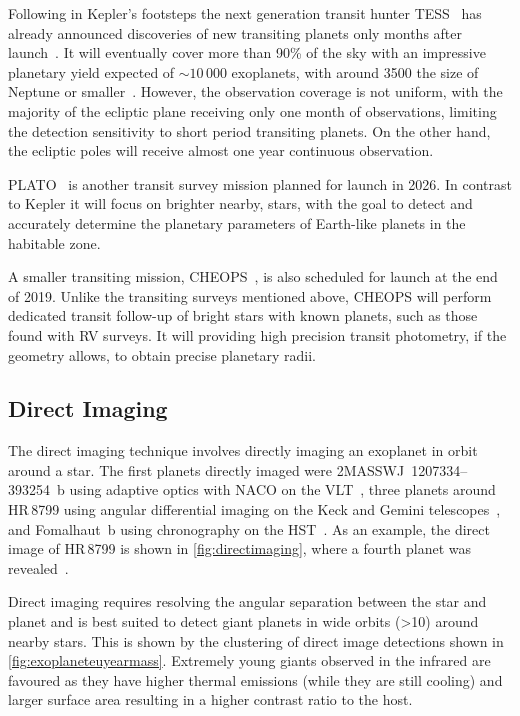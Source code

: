 Following in Kepler's footsteps the next generation transit hunter {TESS}~\citep{ricker_transiting_2015} has already announced discoveries of new transiting planets only months after launch~\citep{vanderspek_tess_2018, gandolfi_tess_2018, huang_tess_2018}.
It will eventually cover more than 90\% of the sky with an impressive planetary yield expected of $\sim10\,000$ exoplanets, with around 3500 the size of Neptune or smaller~\citep{barclay_revised_2018, huang_expected_2018}.
However, the observation coverage is not uniform, with the majority of the ecliptic plane receiving only one month of observations, limiting the detection sensitivity to short period transiting planets.
On the other hand, the ecliptic poles will receive almost one year continuous observation.

{PLATO}~\citep{rauer_plato_2014} is another transit survey mission planned for launch in 2026.
In contrast to Kepler it will focus on brighter nearby, stars, with the goal to detect and accurately determine the planetary parameters of Earth-like planets in the habitable zone.

A smaller transiting mission, {CHEOPS}~\citep{broeg_cheops_2013}, is also scheduled for launch at the end of 2019.
Unlike the transiting surveys mentioned above, {CHEOPS} will perform dedicated transit follow-up of bright stars with known planets, such as those found with {RV} surveys.
It will providing high precision transit photometry, if the geometry allows, to obtain precise planetary radii.


\subsection{Direct Imaging}
\label{subsec:direct_detection}
The direct imaging technique involves directly imaging an exoplanet in orbit around a star.
The first planets directly imaged were {2MASSWJ~1207334--393254~b} using adaptive optics with NACO on the VLT~\citep{chauvin_giant_2004}, three planets around HR\,8799 using angular differential imaging on the Keck and Gemini telescopes~\citep{marois_direct_2008}, and {Fomalhaut~b} using chronography on the HST~\citep{kalas_optical_2008}.
As an example, the direct image of {HR\,8799} is shown in \cref{fig:directimaging}, where a fourth planet was revealed~\citep{marois_images_2010}.

Direct imaging requires resolving the angular separation between the star and planet and is best suited to detect giant planets in wide orbits (>10\AU{}) around nearby stars.
This is shown by the clustering of direct image detections shown in \cref{fig:exoplaneteuyearmass}.
Extremely young giants observed in the infrared are favoured as they have higher thermal emissions (while they are still cooling) and larger surface area resulting in a higher contrast ratio to the host.


